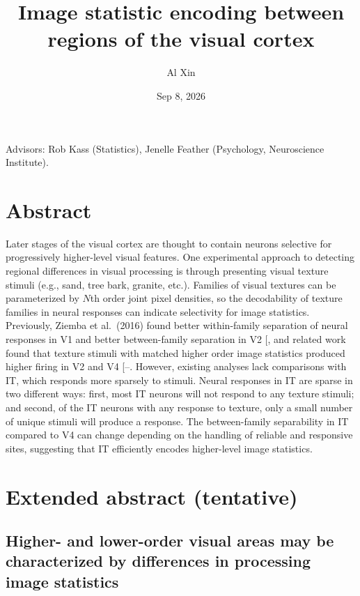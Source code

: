 \documentclass[
  11pt,
  letterpaper,
  DIV=11,
  numbers=noendperiod]{scrartcl}
\title{Image statistic encoding between regions of the visual cortex}
\author{\small Al Xin}
\date{Sep 8, 2026}
\renewcommand*\contentsname{Table of contents}
\newcommand\contentsname{Table of contents}
\begin{document}
\maketitle

\renewcommand*\contentsname{Table of contents}
{
\hypersetup{linkcolor=}
\setcounter{tocdepth}{3}
\tableofcontents
}

\pagebreak

Advisors: Rob Kass (Statistics), Jenelle Feather (Psychology,
Neuroscience Institute).

\section{Abstract}\label{abstract}

Later stages of the visual cortex are thought to contain neurons
selective for progressively higher-level visual features. One
experimental approach to detecting regional differences in visual
processing is through presenting visual texture stimuli (e.g., sand,
tree bark, granite, etc.). Families of visual textures can be
parameterized by \(N\)th order joint pixel densities, so the
decodability of texture families in neural responses can indicate
selectivity for image statistics. Previously, Ziemba et al.~(2016) found
better within-family separation of neural responses in V1 and better
between-family separation in V2
{[}\citeproc{ref-ziemba_selectivity_2016}{1}{]}, and related work found
that texture stimuli with matched higher order image statistics produced
higher firing in V2 and V4
{[}--\citeproc{ref-lee_emergence_2025}{4}{]}.
However, existing analyses lack comparisons with IT, which responds more
sparsely to stimuli. Neural responses in IT are sparse in two different
ways: first, most IT neurons will not respond to any texture stimuli;
and second, of the IT neurons with any response to texture, only a small
number of unique stimuli will produce a response. The between-family
separability in IT compared to V4 can change depending on the handling
of reliable and responsive sites, suggesting that IT efficiently encodes
higher-level image statistics.

\section{Extended abstract
(tentative)}\label{extended-abstract-tentative}

\subsection{Higher- and lower-order visual areas may be characterized by
differences in processing image
statistics}\label{higher--and-lower-order-visual-areas-may-be-characterized-by-differences-in-processing-image-statistics}
\end{document}
